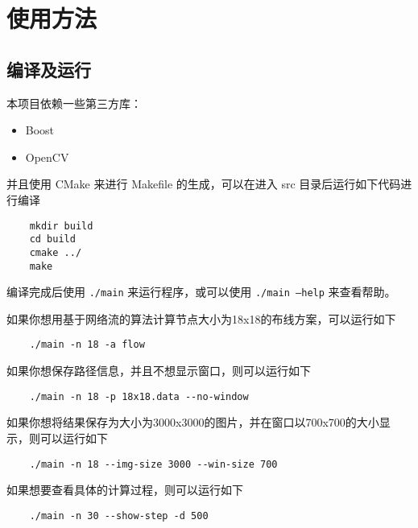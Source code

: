 \section{使用方法}
\subsection{编译及运行}
	\qquad
	本项目依赖一些第三方库：
	\begin{itemize}
		\item Boost
		\item OpenCV
	\end{itemize}

	并且使用 CMake 来进行 Makefile 的生成，可以在进入 src 目录后运行如下代码进行编译
	\begin{verbatim}
    mkdir build
    cd build
    cmake ../
    make
	\end{verbatim}

	编译完成后使用 \texttt{./main} 来运行程序，或可以使用 \texttt{./main --help} 来查看帮助。

	如果你想用基于网络流的算法计算节点大小为18x18的布线方案，可以运行如下

	\begin{verbatim}
    ./main -n 18 -a flow
	\end{verbatim}

	如果你想保存路径信息，并且不想显示窗口，则可以运行如下

	\begin{verbatim}
    ./main -n 18 -p 18x18.data --no-window
	\end{verbatim}

	如果你想将结果保存为大小为3000x3000的图片，并在窗口以700x700的大小显示，则可以运行如下

	\begin{verbatim}
    ./main -n 18 --img-size 3000 --win-size 700
	\end{verbatim}

	如果想要查看具体的计算过程，则可以运行如下

	\begin{verbatim}
    ./main -n 30 --show-step -d 500
	\end{verbatim}
